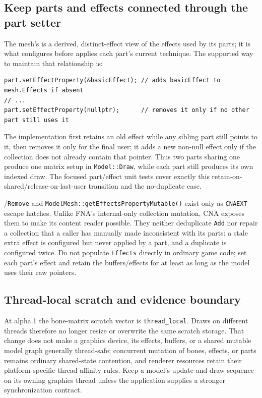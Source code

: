 \subsection{Keep parts and effects connected through the part setter}

The mesh's  is a derived, distinct-effect view of the effects
used by its parts; it is what  configures before
 applies each part's current technique. The supported way to maintain
that relationship is:

\begin{lstlisting}
part.setEffectProperty(&basicEffect); // adds basicEffect to mesh.Effects if absent
// ...
part.setEffectProperty(nullptr);      // removes it only if no other part still uses it
\end{lstlisting}

The implementation first retains an old effect while any sibling part still points to it, then
removes it only for the final user; it adds a new non-null effect only if the collection does not
already contain that pointer. Thus two parts sharing one  produce one
matrix setup in \texttt{Model::Draw}, while each part still produces its own indexed draw. The
focused part/effect unit tests cover exactly this retain-on-shared/release-on-last-user transition
and the no-duplicate case.

/\texttt{Remove} and
\texttt{ModelMesh::getEffectsPropertyMutable()} exist only as \texttt{CNAEXT} escape hatches.
Unlike FNA's internal-only collection mutation, CNA exposes them to make its content reader
possible. They neither deduplicate \texttt{Add} nor repair a collection that a caller has
manually made inconsistent with its parts: a stale extra effect is configured but never applied
by a part, and a duplicate is configured twice. Do not populate \texttt{Effects} directly in
ordinary game code; set each part's effect and retain the buffers/effects for at least as long as
the model uses their raw pointers.

\subsection{Thread-local scratch and evidence boundary}

At alpha.1 the bone-matrix scratch vector is \texttt{thread\_local}. Draws on different threads
therefore no longer resize or overwrite the same scratch storage. That change does not make a
graphics device, its effects, buffers, or a shared mutable model graph generally thread-safe:
concurrent mutation of bones, effects, or parts remains ordinary shared-state contention, and
renderer resources retain their platform-specific thread-affinity rules. Keep a model's update
and draw sequence on its owning graphics thread unless the application supplies a stronger
synchronization contract.

